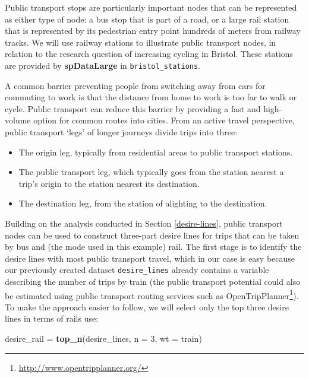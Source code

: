 \documentclass[]{krantz}
\newenvironment{Shaded}{\begin{snugshade}}{\end{snugshade}}
\newcommand{\DataTypeTok}[1]{\textcolor[rgb]{0.27,0.27,0.27}{#1}}
\newcommand{\DecValTok}[1]{\textcolor[rgb]{0.06,0.06,0.06}{#1}}
\newcommand{\KeywordTok}[1]{\textcolor[rgb]{0.27,0.27,0.27}{\textbf{#1}}}
\newcommand{\NormalTok}[1]{#1}
\newcommand{\StringTok}[1]{\textcolor[rgb]{0.5,0.5,0.5}{#1}}
\providecommand{\tightlist}{%
  \setlength{\itemsep}{0pt}\setlength{\parskip}{0pt}}
\let\rmarkdownfootnote\footnote%
\def\footnote{\protect\rmarkdownfootnote}
\renewcommand{\href}[2]{#2\footnote{\url{#1}}}
\begin{document}
Public transport stops are particularly important nodes that can be represented as either type of node: a bus stop that is part of a road, or a large rail station that is represented by its pedestrian entry point hundreds of meters from railway tracks.
We will use railway stations to illustrate public transport nodes, in relation to the research question of increasing cycling in Bristol.
These stations are provided by \textbf{spDataLarge} in \texttt{bristol\_stations}.

A common barrier preventing people from switching away from cars for commuting to work is that the distance from home to work is too far to walk or cycle.
Public transport can reduce this barrier by providing a fast and high-volume option for common routes into cities.
From an active travel perspective, public transport `legs' of longer journeys divide trips into three:

\begin{itemize}
\tightlist
\item
  The origin leg, typically from residential areas to public transport stations.
\item
  The public transport leg, which typically goes from the station nearest a trip's origin to the station nearest its destination.
\item
  The destination leg, from the station of alighting to the destination.
\end{itemize}

Building on the analysis conducted in Section \ref{desire-lines}, public transport nodes can be used to construct three-part desire lines for trips that can be taken by bus and (the mode used in this example) rail.
The first stage is to identify the desire lines with most public transport travel, which in our case is easy because our previously created dataset \texttt{desire\_lines} already contains a variable describing the number of trips by train (the public transport potential could also be estimated using public transport routing services such as \href{http://www.opentripplanner.org/}{OpenTripPlanner}).
To make the approach easier to follow, we will select only the top three desire lines in terms of rails use:

\begin{Shaded}
\begin{Highlighting}[]
\NormalTok{desire_rail =}\StringTok{ }\KeywordTok{top_n}\NormalTok{(desire_lines, }\DataTypeTok{n =} \DecValTok{3}\NormalTok{, }\DataTypeTok{wt =}\NormalTok{ train)}
\end{Highlighting}
\end{Shaded}
\end{document}
